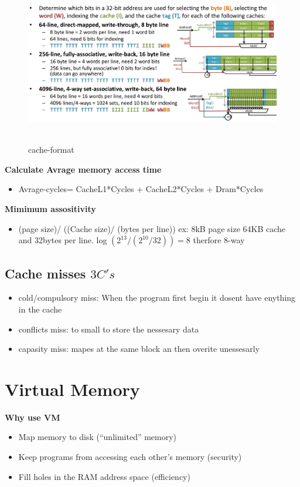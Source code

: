 \documentclass{article}
\begin{document}
\begin{figure}[h]
    \vspace{10mm}
    \centering
    \includegraphics[width=16cm, height=7cm]{image/cache-format.png}
    \caption{cache-format}
\end{figure}


\textbf{Calculate Avrage memory access time}
\begin{itemize}
\item  Avrage-cycles= CacheL1*Cycles + CacheL2*Cycles + Dram*Cycles
\end{itemize}

\textbf{Mimimum assositivity}
\begin{itemize}
\item  (page size)/  ((Cache size)/ (bytes per line)) \newline
  ex: 8kB page size 64KB cache and 32bytes per line. log $(2^{13}/ (2^{10}/32)) = 8$  therfore 8-way
\end{itemize}

\subsection{Cache misses $3C's$}
\begin{itemize}
\item  cold/compulsory miss: When the program first begin it dosent have enything in the cache
\item  conflicts miss: to small to store the nessesary data
\item  capasity miss: mapes at the same block an then overite unessesarly 
\end{itemize}


\newpage


\section{Virtual Memory}
\textbf{Why use VM}
\begin{itemize}
\item  Map memory to disk (“unlimited” memory)
\item  Keep programs from accessing each other’s memory (security)
\item  Fill holes in the RAM address space (efficiency)
\end{itemize}
\end{document}
